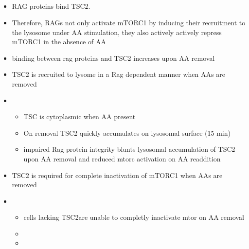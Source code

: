 \documentclass{article}
\begin{document}
\subsection{\cite{demetriades2014regulation}}
\begin{itemize}
	\item RAG proteins bind TSC2.
	\item Therefore, RAGs not only activate mTORC1 by inducing their recruitment to the lysosome under AA stimulation, they also actively actively repress mTORC1 in the absence of AA
	\item binding between rag proteins and TSC2 increases upon AA removal
	\item TSC2 is recruited to lysome in a Rag dependent manner when AAs are removed
	\item \begin{itemize}
			  \item TSC is cytoplasmic when AA present
			  \item On removal TSC2 quickly accumulates on lysosomal surface (15 min)
			  \item impaired Rag protein integrity blunts lysosomal accumulation of TSC2 upon AA removal and reduced mtorc activation on AA readdition
	\end{itemize}
	\item TSC2 is required for complete inactivation of mTORC1 when AAs are removed
	\item \begin{itemize}
			  \item cells lacking TSC2are unable to completly inactivate mtor on AA removal
			  \item 
			  \item
	\end{itemize}
\end{itemize}









\end{document}
